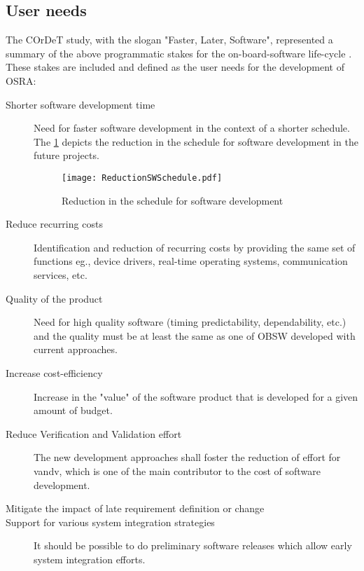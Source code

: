 \subsection{User needs}

The COrDeT study, with the slogan "Faster, Later, Software", represented a summary of the above programmatic stakes for the on-board-software life-cycle \cite{CORDET}\cite{SAVOIR}. These stakes are included and defined as the user needs \cite{SAVOIR}\cite{PhdThesis} for the development of OSRA:

\begin{description}
\item [Shorter software development time] Need for faster software development in the context of a shorter schedule. The \cref{fig:RedSWSched} depicts the reduction in the schedule for software development in the future projects. 

\begin{figure}[h]
	\centering
	\texttt{[image: ReductionSWSchedule.pdf]}
	\caption{Reduction in the schedule for software development}
	\label{fig:RedSWSched}
\end{figure}

\item [Reduce recurring costs] Identification and reduction of recurring costs by providing the same set of functions eg., device drivers, real-time operating systems, communication services, etc.   

\item [Quality of the product] Need for high quality software (timing predictability, dependability, etc.) and the quality must be at least the same as one of OBSW developed with current approaches.

\item [Increase cost-efficiency] Increase in the "value" of the software product that is developed for a given amount of budget.

\item [Reduce Verification and Validation effort] The new development approaches shall foster the reduction of effort for \ac{vandv}, which is one of the main contributor to the cost of software development.

\item [Mitigate the impact of late requirement definition or change] 

\item [Support for various system integration strategies] It should be possible to do preliminary software releases which allow early system integration efforts.


\end{description}

